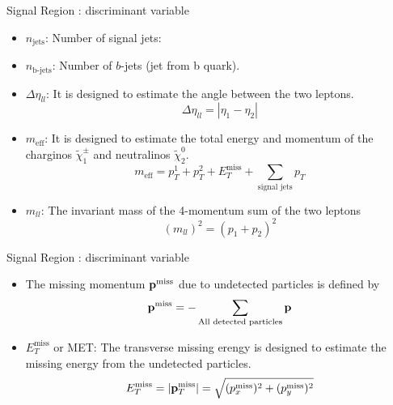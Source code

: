 \documentclass[mathserif,serif]{beamer}
\begin{document}
\begin{frame}{Signal Region : discriminant variable}
\begin{itemize}
\item $n_{\text{jets}}$: Number of signal jets:
\item $n_{\text{b-jets}}$: Number of $b$-jets (jet from b quark).
\item $\Delta \eta_{ll}$: It is designed to estimate the angle between the two leptons.
\begin{equation*}
\Delta \eta_{ll} = |\eta_{1} - \eta_{2}|
\end{equation*}
\item $m_{\text{eff}}$: It is designed to estimate the total energy and momentum of the charginos $\tilde{\chi}_1^\pm$ and neutralinos $\tilde{\chi}_2^0$.
\begin{equation*}
m_{\text{eff}} = p_T^1 + p_T^2 + E_T^{\text{miss}} + \sum_{\text {signal jets}} p_T
\end{equation*}
\item $m_{ll}$: The invariant mass of the 4-momentum sum of the two leptons
\begin{equation*}
(m_{ll})^2 = (p_1 + p_2)^2
\end{equation*}
\end{itemize}
\end{frame}

\begin{frame}{Signal Region : discriminant variable}
\begin{itemize}
\item The missing momentum ${\bf p}^{\text{miss}}$ due to undetected particles is defined by
\begin{equation*}
{\bf p}^{\text{miss}} = - \sum_{\text{All detected particles}}{\bf p}
\end{equation*}
\item $E_{T}^{\text{miss}}$ or MET: The transverse missing erengy is designed to estimate the missing energy from the undetected particles.
\begin{equation*}
E_{T}^{\text{miss}} = |{\bf p}_T^{\text{miss}}| = \sqrt{ (p_x^{\text{miss}})^2 + (p_y^{\text{miss}})^2}
\end{equation*}
\end{itemize}
\end{frame}
\end{document}
